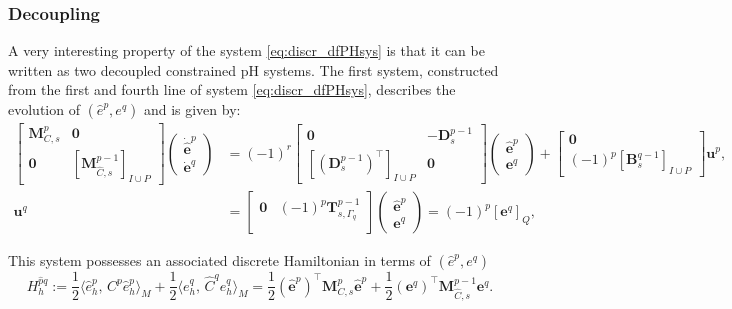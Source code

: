\documentclass{elsarticle}
\newcommand*{\dual}[1]{\ensuremath{\widehat{#1}}}
\newcommand{\inpr}[3][]{\ensuremath{\langle #2, \, #3 \rangle_{#1}}}
\begin{document}
\subsubsection{Decoupling}
A very interesting property of the system \eqref{eq:discr_dfPHsys} is that it can be written as two decoupled constrained pH systems. The first system, constructed from the first and fourth line of  system \eqref{eq:discr_dfPHsys}, describes the evolution of $(\dual{e}^p,e^q)$ and is given by:
\begin{equation}\label{eq:discr_dyn_mixed14}
\begin{aligned}
    \begin{bmatrix}
        \mathbf{M}^p_{C, s} & \mathbf{0} \\
        \mathbf{0} & [\mathbf{M}^{p-1}_{\dual{C}, s}]_{I \cup P}
    \end{bmatrix}
    \begin{pmatrix}
    \dot{\dual{\mathbf{e}}}^p \\
    \dot{\mathbf{e}}^q
    \end{pmatrix} &=  (-1)^r
    \begin{bmatrix}
        \mathbf{0} & -\mathbf{D}^{p-1}_s \\
        [(\mathbf{D}_{s}^{p-1})^\top]_{I \cup P} & \mathbf{0}
    \end{bmatrix}
    \begin{pmatrix}
    \dual{\mathbf{e}}^p \\
    \mathbf{e}^q
    \end{pmatrix} +
    \begin{bmatrix}
        \mathbf{0}\\
        (-1)^{p}[\mathbf{B}^{q-1}_{s}]_{I \cup P}
    \end{bmatrix}
    \mathbf{u}^p, \\
    \mathbf{u}^q &= 
    \begin{bmatrix}
    \mathbf{0} & (-1)^p\mathbf{T}^{p-1}_{s, \Gamma_q} \\
    \end{bmatrix}
    \begin{pmatrix}
    \dual{\mathbf{e}}^p \\
    \mathbf{e}^q
    \end{pmatrix} = (-1)^p[\mathbf{e}^q]_Q,
\end{aligned}
\end{equation}

This system possesses an associated discrete Hamiltonian in terms of $(\dual{e}^p,e^q)$
\begin{equation}\label{eq:discr_H_mixed14}
H_h^{\dual{p}q} := \frac{1}{2}\inpr[M]{\dual{e}_h^p}{{C}^p \dual{e}_h^p} + \frac{1}{2}\inpr[M]{{e}_h^q}{\dual{C}^q {e}_h^q} = \frac{1}{2} (\dual{\mathbf{e}}^p)^\top \mathbf{M}^p_{C, s} \dual{\mathbf{e}}^p + \frac{1}{2} (\mathbf{e}^q)^\top \mathbf{M}^{p-1}_{\dual{C}, s} \mathbf{e}^q.
\end{equation}
 
\end{document}
